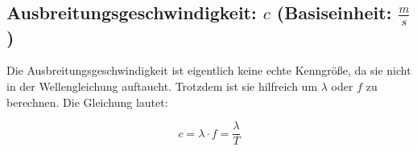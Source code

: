 \subsection[Ausbreitungsgeschwindigkeit]{Ausbreitungsgeschwindigkeit: $c$ (Basiseinheit: $\frac{m}{s}$)}

Die Ausbreitungsgeschwindigkeit ist eigentlich keine echte Kenngröße, da sie nicht in der Wellengleichung auftaucht. Trotzdem ist sie hilfreich um $\lambda$ oder $f$ zu berechnen. Die Gleichung lautet:

\begin{equation} \label{eq:wellen_c}
	c=\lambda \cdot f=\frac{\lambda}{T}
\end{equation}